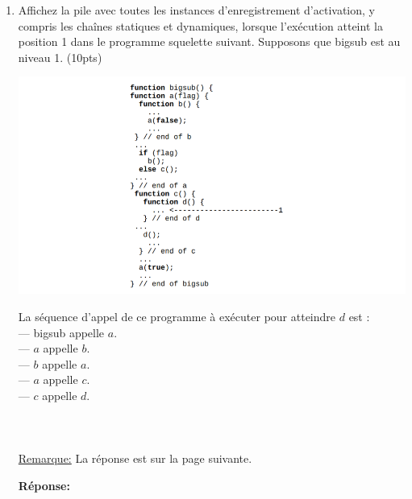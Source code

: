 \documentclass[12pt]{book}
\begin{document}
\begin{enumerate}
\newpage
    \item Affichez la pile avec toutes les instances d'enregistrement d'activation, y compris les chaînes statiques et dynamiques, lorsque l'exécution atteint la position 1 dans le programme squelette suivant. Supposons que bigsub est au niveau 1. (10pts)
    
    \includegraphics[scale=1]{D4_Q4_question.png} %

    La séquence d'appel de ce programme à exécuter pour atteindre $d$ est :\\
    --- bigsub appelle $a$.\\
    --- $a$ appelle $b$.\\
    --- $b$ appelle $a$.\\
    --- $a$ appelle $c$.\\
    --- $c$ appelle $d$.
    \\\\\\\\
    \underline{Remarque:} La réponse est sur la page suivante.

    \newpage
    
    \textbf{Réponse:}


\end{enumerate}
\end{document}

